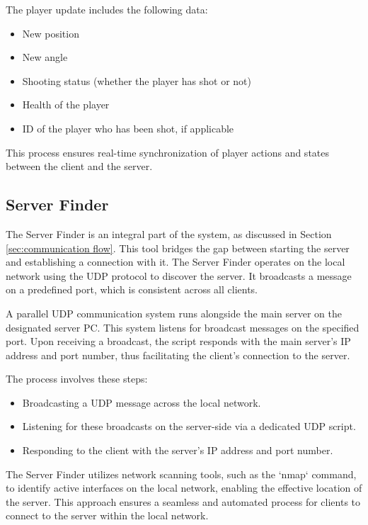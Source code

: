 The player update includes the following data:
\begin{itemize}
    \item New position
    \item New angle
    \item Shooting status (whether the player has shot or not)
    \item Health of the player
    \item ID of the player who has been shot, if applicable
\end{itemize}

This process ensures real-time synchronization of player actions and states between the client and the server.

\subsection{Server Finder}
\label{subsec:serverfinder}

The Server Finder is an integral part of the system, as discussed in Section \ref{sec:communication flow}. This tool bridges the gap between starting the server and establishing a connection with it. The Server Finder operates on the local network using the UDP protocol to discover the server. It broadcasts a message on a predefined port, which is consistent across all clients.

A parallel UDP communication system runs alongside the main server on the designated server PC. This system listens for broadcast messages on the specified port. Upon receiving a broadcast, the script responds with the main server's IP address and port number, thus facilitating the client's connection to the server.

The process involves these steps:
\begin{itemize}
    \item Broadcasting a UDP message across the local network.
    \item Listening for these broadcasts on the server-side via a dedicated UDP script.
    \item Responding to the client with the server's IP address and port number.
\end{itemize}

The Server Finder utilizes network scanning tools, such as the `nmap` command, to identify active interfaces on the local network, enabling the effective location of the server. This approach ensures a seamless and automated process for clients to connect to the server within the local network.

